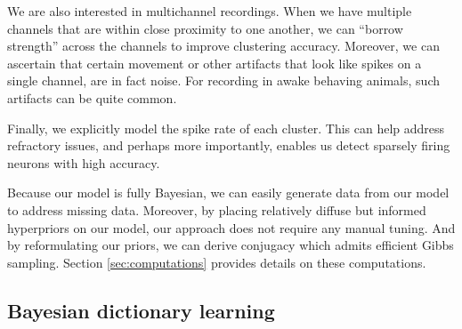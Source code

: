 \documentclass[journal]{IEEEtran}
\begin{document}
We are also interested in multichannel recordings.  When we have multiple channels that are within close proximity to one another, we can ``borrow strength'' across the channels to improve clustering accuracy.  Moreover, we can ascertain that certain movement or other artifacts that look like spikes on a single channel, are in fact noise.  For recording in awake behaving animals, such artifacts can be quite common. 

Finally, we explicitly model the spike rate of each cluster.  This can help address refractory issues, and perhaps more importantly, enables us detect sparsely firing neurons with high accuracy.

Because our model is fully Bayesian, we can easily generate data from our model to address missing data.  Moreover, by placing relatively diffuse but informed hyperpriors on our model, our approach does not require any manual tuning. And by reformulating our priors, we can derive conjugacy which admits efficient Gibbs sampling.  Section \ref{sec:computations} provides details on these computations.







\subsection{Bayesian dictionary learning\label{sec:dict}}
\end{document}
